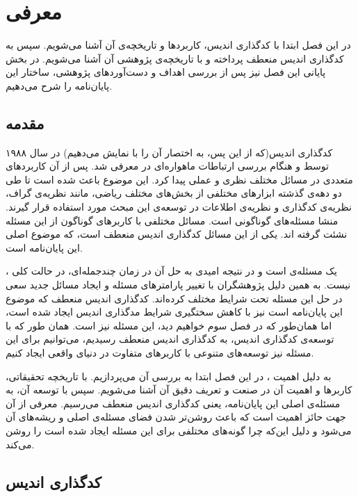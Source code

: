 \chapter{معرفی}
\label{chapter:introduction}

 در این فصل ابتدا با کدگذاری اندیس، کاربردها و تاریخچه‌ی آن آشنا می‌شویم. سپس به کدگذاری اندیس منعطف پرداخته و با تاریخچه‌ی پژوهشی آن آشنا می‌شویم. در بخش پایانی این فصل نیز پس از بررسی اهداف و دست‌آوردهای پژوهشی، ساختار این پایان‌نامه را شرح می‌دهیم.
\pagebreak

\section{مقدمه}
کدگذاری اندیس(که از این پس، به اختصار آن را با
\icod
نمایش می‌دهیم) در سال ۱۹۸۸ توسط 
و
هنگام بررسی ارتباطات ماهواره‌ای در
\cite{25}
معرفی شد. پس از آن \icod کاربردهای متعددی در مسائل مختلف نظری و عملی پیدا کرد. این موضوع باعث شده است تا طی دو دهه‌ی گذشته ابزارهای مختلفی از بخش‌های مختلف ریاضی، مانند نظریه‌ی گراف، نظریه‌ی کدگذاری و نظریه‌ی اطلاعات در توسعه‌ی این مبحث مورد استفاده قرار گیرند. \icod منشا مسئله‌های گوناگونی است. مسائل مختلفی با کاربرهای گوناگون از این مسئله نشئت گرفته اند. یکی از این مسائل کدگذاری اندیس منعطف است، که موضوع اصلی این پایان‌نامه است.

	\icod، یک مسئله‌ی
است و در نتیجه امیدی به حل آن در زمان چندجمله‌ای، در حالت کلی نیست. به همین دلیل پژوهشگران با تغییر پارامترهای مسئله و ایجاد مسائل جدید سعی در حل این مسئله تحت شرایط مختلف کرده‌اند. کدگذاری اندیس منعطف که موضوع این پایان‌نامه است نیز با کاهش سختگیری شرایط مدگذاری اندیس ایجاد شده است، اما همان‌طور که در فصل سوم خواهیم دید، این مسئله نیز
\nphard
است. همان طور که با توسعه‌ی کدگذاری اندیس، به کدگذاری اندیس منعطف رسیدیم، می‌توانیم برای  این مسئله نیز توسعه‌های متنوعی با کاربرهای متفاوت در دنیای واقعی ایجاد کنیم.

به دلیل اهمیت \icod، در این فصل ابتدا به بررسی آن می‌پردازیم. با تاریخچه تحقیقاتی، کاربرها و اهمیت آن در صنعت و تعریف دقیق آن آشنا می‌شویم. سپس با توسعه آن، به مسئله‌ی اصلی این پایان‌نامه، یعنی کدگذاری اندیس منعطف می‌رسیم. معرفی \icod از آن جهت حائز اهمیت است که باعث روشن‌تر شدن فضای مسئله‌‌ی اصلی و ریشه‌های آن می‌شود و دلیل این‌که چرا گونه‌های مختلفی برای این مسئله ایجاد شده است را روشن می‌کند.
\pagebreak
\section{کدگذاری اندیس}
